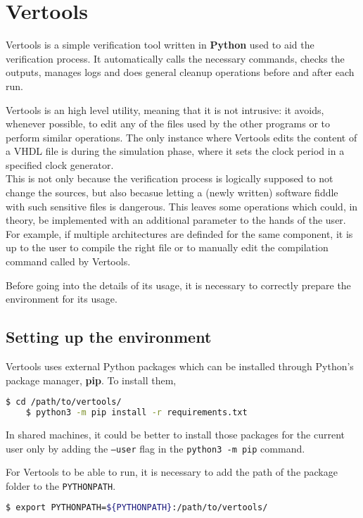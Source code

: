 \section{Vertools}
\label{sec:vertools}
Vertools is a simple verification tool written in \textbf{Python} used to aid the verification process. It automatically calls the necessary commands, checks the outputs, manages logs and does general cleanup operations before and after each run.

Vertools is an high level utility, meaning that it is not intrusive: it avoids, whenever possible, to edit any of the files used by the other programs or to perform similar operations. The only instance where Vertools edits the content of a VHDL file is during the simulation phase, where it sets the clock period in a specified clock generator. \\
This is not only because the verification process is logically supposed to not change the sources, but also becasue letting a (newly written) software fiddle with such sensitive files is dangerous. This leaves some operations which could, in theory, be implemented with an additional parameter to the hands of the user. For example, if multiple architectures are definded for the same component, it is up to the user to compile the right file or to manually edit the compilation command called by Vertools.

Before going into the details of its usage, it is necessary to correctly prepare the environment for its usage.

\subsection{Setting up the environment}
Vertools uses external Python packages which can be installed through Python's package manager, \textbf{pip}. To install them,
\begin{lstlisting}[language=bash]
    $ cd /path/to/vertools/
    $ python3 -m pip install -r requirements.txt
\end{lstlisting}
In shared machines, it could be better to install those packages for the current user only by adding the \texttt{--user} flag in the \texttt{python3 -m pip} command.

For Vertools to be able to run, it is necessary to add the path of the package folder to the \texttt{PYTHONPATH}.
\begin{lstlisting}[language=bash]
    $ export PYTHONPATH=${PYTHONPATH}:/path/to/vertools/
\end{lstlisting}

